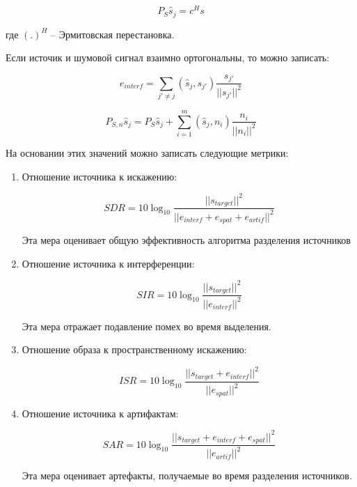 \begin{equation}
P_S \hat{s}_j = c^H s
\end{equation}

где $(.)^H$ -- Эрмитовская перестановка. 

Если источик и шумовой сигнал взаимно ортогональны, то можно записать:

\begin{equation}
	e_{interf} = \sum_{j' \ne j} (\hat{s}_j, s_{j'}) \frac{s_{j'}}{|| s_{j'} ||^2}
\end{equation}

\begin{equation}
P_{S,n}\hat{s}_j = P_S \hat{s}_j + \sum_{i=1}^{m}(\hat{s}_j, n_i) \frac{n_i}{|| n_i ||^2}
\end{equation}

На основании этих значений можно записать следующие метрики:

\begin{enumerate}
	\item Отношение источника к искажению:
	
	\begin{equation}
		SDR = 10 \log_{10} \frac{|| s_{target} ||^2}{|| e_{interf} + e_{spat} + e_{artif} ||^2}
	\end{equation}
	
	Эта мера оценивает общую эффективность алгоритма разделения источников
	
	\item  Отношение источника к интерференции:
	
	\begin{equation}
		SIR = 10 \log_{10} \frac{|| s_{target} ||^2}{|| e_{interf} ||^2}
	\end{equation}
	
	Эта мера отражает подавление помех во время выделения.
	
	\item Отношение образа к пространственному искажению:
	
	\begin{equation}
	ISR = 10 \log_{10} \frac{|| s_{target} + e_{interf} ||^2}{|| e_{spat} ||^2}
	\end{equation}
	
	\item Отношение источника к артифактам:
	
	\begin{equation}
	SAR = 10 \log_{10} \frac{|| s_{target} + e_{interf} + e_{spat} ||^2}{|| e_{artif} ||^2}
	\end{equation}
	
	Эта мера оценивает артефакты, получаемые во время разделения источников.
\end{enumerate}


